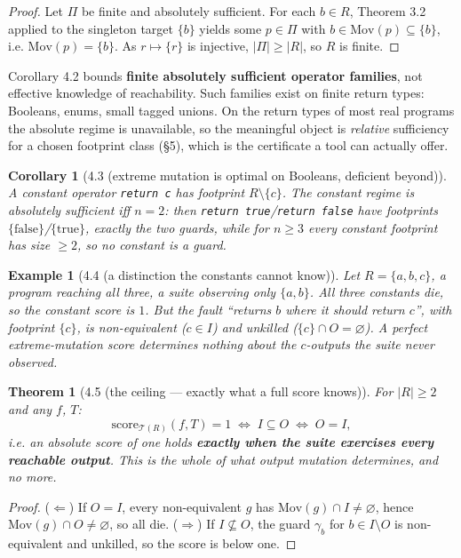 \documentclass[conference]{IEEEtran}
\newcommand{\Mov}{\mathrm{Mov}}
\newcommand{\score}{\mathrm{score}}
\theoremstyle{run}
\newtheorem*{theorem}{Theorem}
\newtheorem*{corollary}{Corollary}
\newtheorem*{example}{Example}
\begin{document}
\begin{proof}
Let $\Pi$ be finite and absolutely sufficient. For each $b \in R$, Theorem 3.2 applied to the singleton target $\{b\}$ yields some $p\in\Pi$ with $b\in\Mov(p)\subseteq\{b\}$, i.e. $\Mov(p)=\{b\}$. As $r \mapsto \{r\}$ is injective, $|\Pi| \ge |R|$, so $R$ is finite.
\end{proof}

Corollary 4.2 bounds \textbf{finite absolutely sufficient operator families}, not effective knowledge of reachability. Such families exist on finite return types: Booleans, enums, small tagged unions. On the return types of most real programs the absolute regime is unavailable, so the meaningful object is \emph{relative} sufficiency for a chosen footprint class (\S 5), which is the certificate a tool can actually offer.

\begin{corollary}[4.3 (extreme mutation is optimal on Booleans, deficient beyond)]
A constant operator \texttt{return c} has footprint $R \setminus \{c\}$. The constant regime is absolutely sufficient iff $n = 2$: then \texttt{return true}/\texttt{return false} have footprints $\{\mathrm{false}\}$/$\{\mathrm{true}\}$, exactly the two guards, while for $n \ge 3$ every constant footprint has size $\ge 2$, so no constant is a guard.
\end{corollary}

\begin{example}[4.4 (a distinction the constants cannot know)]
Let $R = \{a,b,c\}$, a program reaching all three, a suite observing only $\{a,b\}$. All three constants die, so the constant score is $1$. But the fault ``returns $b$ where it should return $c$'', with footprint $\{c\}$, is non-equivalent ($c\in I$) and unkilled ($\{c\}\cap O=\varnothing$). A perfect extreme-mutation score determines nothing about the $c$-outputs the suite never observed.
\end{example}

\begin{theorem}[4.5 (the ceiling --- exactly what a full score knows)]
For $|R| \ge 2$ and any $f$, $T$: \[ \score_{\mathcal{T}(R)}(f,T) = 1 \;\iff\; I \subseteq O \;\iff\; O = I, \] i.e. an absolute score of one holds \textbf{exactly when the suite exercises every reachable output}. This is the whole of what output mutation determines, and no more.
\end{theorem}

\begin{proof}
($\Leftarrow$) If $O = I$, every non-equivalent $g$ has $\Mov(g)\cap I \neq \varnothing$, hence $\Mov(g)\cap O \neq \varnothing$, so all die. ($\Rightarrow$) If $I \not\subseteq O$, the guard $\gamma_b$ for $b \in I\setminus O$ is non-equivalent and unkilled, so the score is below one.
\end{proof}
\end{document}
